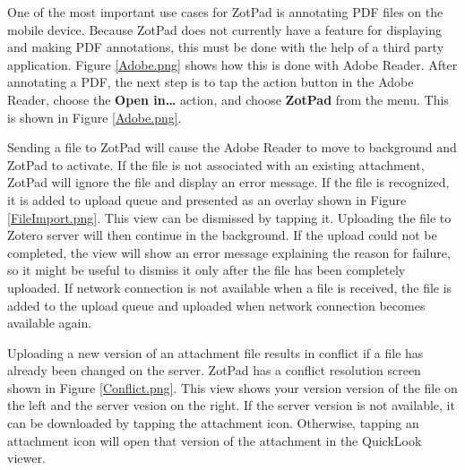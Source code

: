\documentclass[oneside, openany, 12pt]{tufte-book}
\newcommand{\image}[2]{
	\center
	\fbox{\texttt{[image: images/iPhone/\{\#2]}}}

	\refstepcounter{figure}
	\smallskip\noindent\small Figure \thefigure: #1
	\label{#2}
	}
\newcommand{\ipadfootnote}[1]{}
\newcommand{\image}[2]{
	\caption{#1}
	\label{#2}
	\fbox{\texttt{[image: images/iPad/\{\#2]}}}
	}
\newcommand{\ipadfootnote}[1]{\footnote{#1}}
\begin{document}
\FloatBarrier

One of the most important use cases for ZotPad is annotating PDF files on the mobile device. Because ZotPad does not currently have a feature for displaying and making PDF annotations, this must be done with the help of a third party application\ipadfootnote{Support for annotating PDFs inside ZotPad is planned for version 1.3}. Figure \ref{Adobe.png} shows how this is done with Adobe Reader\ipadfootnote{Adobe Reader is a free app that can be used to view and annotate PDF files and is available for both iPad and iPhone.}. After annotating a PDF, the next step is to tap the action button in the Adobe Reader, choose the \textbf{Open in\ldots} action, and choose \textbf{ZotPad} from the menu. This is shown in Figure \ref{Adobe.png}.

\begin{figure}
\image{Sending a file back to ZotPad}{Adobe.png}
\end{figure}

\begin{figure}
\image{File import view}{FileImport.png}
\end{figure}

Sending a file to ZotPad will cause the Adobe Reader to move to background and ZotPad to activate. If the file is not associated with an existing attachment\ipadfootnote{Adding new attachments using ZotPad is currently not possible, but this feature can be added if there is sufficient demand.}, ZotPad will ignore the file and display an error message. If the file is recognized, it is added to upload queue and presented as an overlay shown in Figure \ref{FileImport.png}. This view can be dismissed by tapping it. Uploading the file to Zotero server will then continue in the background. If the upload could not be completed, the view will show an error message explaining the reason for failure, so it might be useful to dismiss it only after the file has been completely uploaded. If network connection is not available when a file is received, the file is added to the upload queue and uploaded when network connection becomes available again.

Uploading a new version of an attachment file results in conflict if a file has already been changed on the server. ZotPad has a conflict resolution screen shown in Figure \ref{Conflict.png}. This view shows your version version of the file on the left and the server vesion on the right. If the server version is not available, it can be downloaded by tapping the attachment icon. Otherwise, tapping an attachment icon will open that version of the attachment in the QuickLook viewer.
\end{document}

